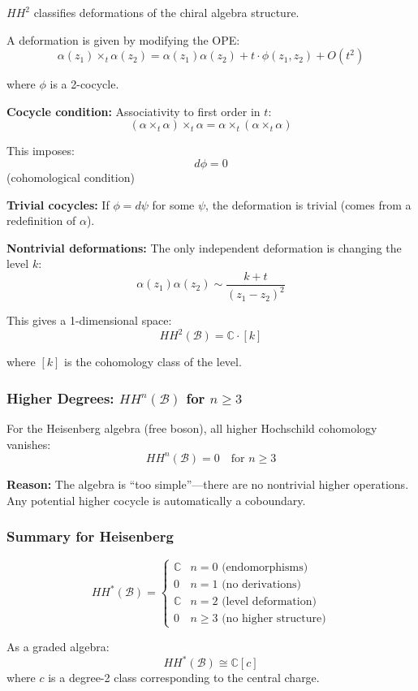\begin{example}
$HH^2$ classifies deformations of the chiral algebra structure.

A deformation is given by modifying the OPE:
$$\alpha(z_1) \times_t \alpha(z_2) = \alpha(z_1)\alpha(z_2) + t \cdot \phi(z_1, z_2) + O(t^2)$$

where $\phi$ is a 2-cocycle.

\textbf{Cocycle condition:} Associativity to first order in $t$:
$$(\alpha \times_t \alpha) \times_t \alpha = \alpha \times_t (\alpha \times_t \alpha)$$

This imposes:
$$d\phi = 0$$
(cohomological condition)

\textbf{Trivial cocycles:} If $\phi = d\psi$ for some $\psi$, the deformation is trivial
(comes from a redefinition of $\alpha$).

\textbf{Nontrivial deformations:} The only independent deformation is changing the level $k$:
$$\alpha(z_1)\alpha(z_2) \sim \frac{k + t}{(z_1-z_2)^2}$$

This gives a 1-dimensional space:
$$\boxed{HH^2(\mathcal{B}) = \mathbb{C} \cdot [k]}$$

where $[k]$ is the cohomology class of the level.

\subsubsection{Higher Degrees: $HH^n(\mathcal{B})$ for $n \geq 3$}

For the Heisenberg algebra (free boson), all higher Hochschild cohomology vanishes:
$$HH^n(\mathcal{B}) = 0 \quad \text{for } n \geq 3$$

\textbf{Reason:} The algebra is ``too simple''---there are no nontrivial higher operations.
Any potential higher cocycle is automatically a coboundary.

\subsubsection{Summary for Heisenberg}

$$HH^*(\mathcal{B}) = \begin{cases}
\mathbb{C} & n = 0 \text{ (endomorphisms)}\\
0 & n = 1 \text{ (no derivations)}\\
\mathbb{C} & n = 2 \text{ (level deformation)}\\
0 & n \geq 3 \text{ (no higher structure)}
\end{cases}$$

As a graded algebra:
$$HH^*(\mathcal{B}) \cong \mathbb{C}[c]$$
where $c$ is a degree-2 class corresponding to the central charge.
\end{example}

